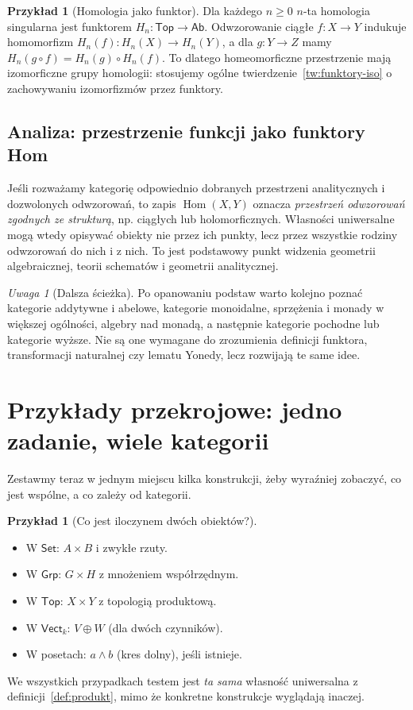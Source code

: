 \documentclass[11pt,a4paper]{article}
\numberwithin{equation}{section}
\theoremstyle{plain}
\theoremstyle{definition}
\newtheorem{przyklad}[twierdzenie]{Przykład}
\theoremstyle{remark}
\newtheorem{uwaga}[twierdzenie]{Uwaga}
\newcommand{\cat}[1]{\mathsf{#1}}
\newcommand{\Set}{\cat{Set}}
\newcommand{\Grp}{\cat{Grp}}
\newcommand{\Top}{\cat{Top}}
\newcommand{\Vect}{\cat{Vect}}
\newcommand{\Ab}{\cat{Ab}}
\newcommand{\Hom}{\operatorname{Hom}}
\begin{document}
\begin{przyklad}[Homologia jako funktor]
Dla każdego $n\geq0$ $n$-ta homologia singularna jest funktorem $H_n:\Top\to\Ab$. Odwzorowanie ciągłe $f:X\to Y$ indukuje homomorfizm $H_n(f):H_n(X)\to H_n(Y)$, a dla $g:Y\to Z$ mamy $H_n(g\circ f)=H_n(g)\circ H_n(f)$. To dlatego homeomorficzne przestrzenie mają izomorficzne grupy homologii: stosujemy ogólne twierdzenie~\ref{tw:funktory-iso} o zachowywaniu izomorfizmów przez funktory.
\end{przyklad}

\subsection{Analiza: przestrzenie funkcji jako funktory Hom}

Jeśli rozważamy kategorię odpowiednio dobranych przestrzeni analitycznych i dozwolonych odwzorowań, to zapis $\Hom(X,Y)$ oznacza \emph{przestrzeń odwzorowań zgodnych ze strukturą}, np. ciągłych lub holomorficznych. Własności uniwersalne mogą wtedy opisywać obiekty nie przez ich punkty, lecz przez wszystkie rodziny odwzorowań do nich i z nich. To jest podstawowy punkt widzenia geometrii algebraicznej, teorii schematów i geometrii analitycznej.

\begin{uwaga}[Dalsza ścieżka]
Po opanowaniu podstaw warto kolejno poznać kategorie addytywne i abelowe, kategorie monoidalne, sprzężenia i monady w większej ogólności, algebry nad monadą, a następnie kategorie pochodne lub kategorie wyższe. Nie są one wymagane do zrozumienia definicji funktora, transformacji naturalnej czy lematu Yonedy, lecz rozwijają te same idee.
\end{uwaga}

\section{Przykłady przekrojowe: jedno zadanie, wiele kategorii}\label{sec:przekrojowe}

Zestawmy teraz w jednym miejscu kilka konstrukcji, żeby wyraźniej zobaczyć, co jest wspólne, a co zależy od kategorii.

\begin{przyklad}[Co jest iloczynem dwóch obiektów?]
\leavevmode\par\noindent
\begin{itemize}
\item W $\Set$: $A\times B$ i zwykłe rzuty.
\item W $\Grp$: $G\times H$ z mnożeniem współrzędnym.
\item W $\Top$: $X\times Y$ z topologią produktową.
\item W $\Vect_k$: $V\oplus W$ (dla dwóch czynników).
\item W posetach: $a\wedge b$ (kres dolny), jeśli istnieje.
\end{itemize}
We wszystkich przypadkach testem jest \emph{ta sama} własność uniwersalna z definicji~\ref{def:produkt}, mimo że konkretne konstrukcje wyglądają inaczej.
\end{przyklad}
\end{document}
